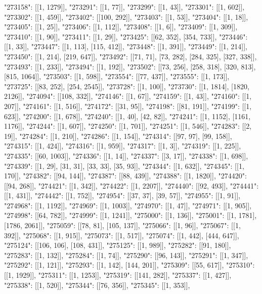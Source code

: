{"273158": [[1, 1279]],
 "273291": [[1, 77]],
 "273299": [[1, 43]],
 "273301": [[1, 602]],
 "273302": [[1, 459]],
 "273402": [[100, 292]],
 "273403": [[1, 53]],
 "273404": [[1, 18]],
 "273405": [[1, 25]],
 "273406": [[1, 112]],
 "273408": [[1, 6]],
 "273409": [[1, 309]],
 "273410": [[1, 90]],
 "273411": [[1, 29]],
 "273425": [[62, 352], [354, 733]],
 "273446": [[1, 33]],
 "273447": [[1, 113], [115, 412]],
 "273448": [[1, 391]],
 "273449": [[1, 214]],
 "273450": [[1, 214], [219, 647]],
 "273492": [[71, 71], [73, 282], [284, 325], [327, 338]],
 "273493": [[1, 233]],
 "273494": [[1, 192]],
 "273502": [[73, 256], [258, 318], [320, 813], [815, 1064]],
 "273503": [[1, 598]],
 "273554": [[77, 437]],
 "273555": [[1, 173]],
 "273725": [[83, 252], [254, 2545]],
 "273728": [[1, 100]],
 "273730": [[1, 1814], [1820, 2126]],
 "274094": [[108, 332]],
 "274146": [[1, 67]],
 "274159": [[1, 43]],
 "274160": [[1, 207]],
 "274161": [[1, 516]],
 "274172": [[31, 95]],
 "274198": [[81, 191]],
 "274199": [[1, 623]],
 "274200": [[1, 678]],
 "274240": [[1, 40], [42, 82]],
 "274241": [[1, 1152], [1161, 1176]],
 "274244": [[1, 607]],
 "274250": [[1, 701]],
 "274251": [[1, 546]],
 "274283": [[2, 19]],
 "274284": [[1, 210]],
 "274286": [[1, 154]],
 "274314": [[97, 97], [99, 158]],
 "274315": [[1, 424]],
 "274316": [[1, 959]],
 "274317": [[1, 3]],
 "274319": [[1, 225]],
 "274335": [[60, 1003]],
 "274336": [[1, 14]],
 "274337": [[3, 17]],
 "274338": [[1, 698]],
 "274339": [[1, 29], [31, 31], [33, 33], [35, 93]],
 "274344": [[1, 632]],
 "274345": [[1, 170]],
 "274382": [[94, 144]],
 "274387": [[88, 439]],
 "274388": [[1, 1820]],
 "274420": [[94, 268]],
 "274421": [[1, 342]],
 "274422": [[1, 2207]],
 "274440": [[92, 493]],
 "274441": [[1, 431]],
 "274442": [[1, 752]],
 "274954": [[37, 37], [39, 57]],
 "274955": [[1, 91]],
 "274968": [[1, 1192]],
 "274969": [[1, 1003]],
 "274970": [[1, 47]],
 "274971": [[1, 905]],
 "274998": [[64, 782]],
 "274999": [[1, 1241]],
 "275000": [[1, 136]],
 "275001": [[1, 1781], [1786, 2061]],
 "275059": [[78, 81], [105, 137]],
 "275066": [[1, 96]],
 "275067": [[1, 392]],
 "275068": [[1, 915]],
 "275073": [[1, 517]],
 "275074": [[1, 442], [444, 647]],
 "275124": [[106, 106], [108, 431]],
 "275125": [[1, 989]],
 "275282": [[91, 180]],
 "275283": [[1, 132]],
 "275284": [[1, 74]],
 "275290": [[96, 143]],
 "275291": [[1, 347]],
 "275292": [[1, 121]],
 "275293": [[1, 142], [144, 201]],
 "275309": [[55, 617]],
 "275310": [[1, 1929]],
 "275311": [[1, 1253]],
 "275319": [[141, 282]],
 "275337": [[1, 427]],
 "275338": [[1, 520]],
 "275344": [[76, 356]],
 "275345": [[1, 353]],
}
